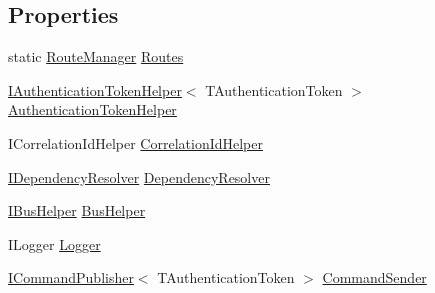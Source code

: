 \subsection*{Properties}
\begin{DoxyCompactItemize}
\item 
static \hyperlink{classCqrs_1_1Bus_1_1RouteManager}{Route\+Manager} \hyperlink{classCqrs_1_1Akka_1_1Commands_1_1AkkaCommandBus_a93ddefb347d0cbc4f869c6d0866c8c64_a93ddefb347d0cbc4f869c6d0866c8c64}{Routes}
\item 
\hyperlink{interfaceCqrs_1_1Authentication_1_1IAuthenticationTokenHelper}{I\+Authentication\+Token\+Helper}$<$ T\+Authentication\+Token $>$ \hyperlink{classCqrs_1_1Akka_1_1Commands_1_1AkkaCommandBus_ad74a628484d215ec6daab02b20ac1dbe_ad74a628484d215ec6daab02b20ac1dbe}{Authentication\+Token\+Helper}
\item 
I\+Correlation\+Id\+Helper \hyperlink{classCqrs_1_1Akka_1_1Commands_1_1AkkaCommandBus_ad8bdf5674c0d5ea3fd9340bd8cd4b0a8_ad8bdf5674c0d5ea3fd9340bd8cd4b0a8}{Correlation\+Id\+Helper}
\item 
\hyperlink{interfaceCqrs_1_1Configuration_1_1IDependencyResolver}{I\+Dependency\+Resolver} \hyperlink{classCqrs_1_1Akka_1_1Commands_1_1AkkaCommandBus_ae1229644077b0740d9014708d15b44c2_ae1229644077b0740d9014708d15b44c2}{Dependency\+Resolver}
\item 
\hyperlink{interfaceCqrs_1_1Bus_1_1IBusHelper}{I\+Bus\+Helper} \hyperlink{classCqrs_1_1Akka_1_1Commands_1_1AkkaCommandBus_abe5501970c0e39abb9a70670ab985fdc_abe5501970c0e39abb9a70670ab985fdc}{Bus\+Helper}
\item 
I\+Logger \hyperlink{classCqrs_1_1Akka_1_1Commands_1_1AkkaCommandBus_a218e431067a4cadbdd711d74cbe8e53b_a218e431067a4cadbdd711d74cbe8e53b}{Logger}
\item 
\hyperlink{interfaceCqrs_1_1Commands_1_1ICommandPublisher}{I\+Command\+Publisher}$<$ T\+Authentication\+Token $>$ \hyperlink{classCqrs_1_1Akka_1_1Commands_1_1AkkaCommandBus_ae3659627842e6d556320c2d79ab17ebd_ae3659627842e6d556320c2d79ab17ebd}{Command\+Sender}

\end{DoxyCompactItemize}
